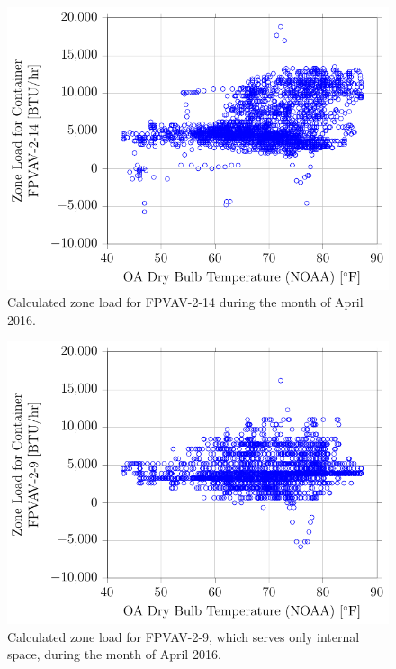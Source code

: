 \begin{figure}
\centering
\includegraphics[]{Plots/2016-06-22-1704-ZoneLoadforContainerFPVAV214vsOADryBulbTemperatureNOAA.pdf}
\caption{Calculated zone load for FPVAV-2-14 during the month of April 2016.}
\label{fig:ZoneLoadforContainerFPVAV214vsOADryBulbTemperatureNOAA}
\end{figure}


\begin{figure}
\centering
\includegraphics[]{Plots/2016-06-22-1716-ZoneLoadforContainerFPVAV29vsOADryBulbTemperatureNOAA.pdf}
\caption{Calculated zone load for FPVAV-2-9, which serves only internal space, during the month of April 2016.}
\label{fig:ZoneLoadforContainerFPVAV29vsOADryBulbTemperatureNOAA}
\end{figure}


